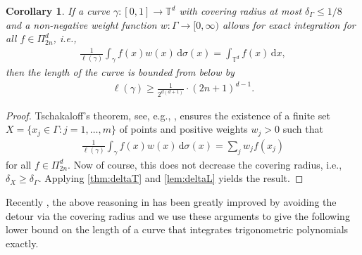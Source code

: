 \documentclass[11pt,a4paper,twoside,final,biblatex]{scrartcl}
\newcommand{\T}{\ensuremath{\mathbb{T}}}
\renewcommand{\d}{\,\mathrm{d}}
\newtheorem{corollary}[theorem]{Corollary}
\theoremstyle{definition}
\numberwithin{equation}{section}
\numberwithin{table}{section}
\numberwithin{figure}{section}
\begin{document}
\begin{corollary}\label{cor:Tschak2}
 If a curve $\gamma\colon[0,1]\to\T^d$ with covering radius at most $\delta_{\Gamma}\le 1/8$ and a non-negative weight function $w\colon\Gamma\to[0,\infty)$ allows for exact integration for all $f\in\Pi_{2n}^d$, i.e.,
 \begin{align*}
  \frac{1}{\ell(\gamma)}\int_{\gamma} f(x) w(x) \d \sigma(x)=\int_{\T^d} f(x)\d x,
 \end{align*}
 then the length of the curve is bounded from below by
 \begin{align*}
     \ell(\gamma)\ge \frac{1}{2^{d(d+1)}} \cdot (2n+1)^{d-1}.
 \end{align*}
\end{corollary}
\begin{proof}
 Tschakaloff's theorem, see, e.g., \cite[Thm.~1.24]{Sc17}, ensures the existence of a finite set $X=\{x_j\in\Gamma:j=1,\hdots,m\}$ of points and positive weights $w_j>0$ such that
 \begin{align*}
   \frac{1}{\ell(\gamma)}\int_{\gamma} f(x) w(x) \d \sigma(x)
   =\sum_j w_j f(x_j)
 \end{align*}
 for all $f\in\Pi_{2n}^d$.
 Now of course, this does not decrease the covering radius, i.e., $\delta_X\ge\delta_{\Gamma}$.
 Applying \cref{thm:deltaT} and \cref{lem:deltaL} yields the result.
\end{proof}

Recently \cite{EhGr26}, the above reasoning in \cite[last part of the proof of Thm.~2.2]{EhGr23} has been greatly improved by avoiding the detour via the covering radius and we use these arguments to give the following lower bound on the length of a curve that integrates trigonometric polynomials exactly.
\end{document}
